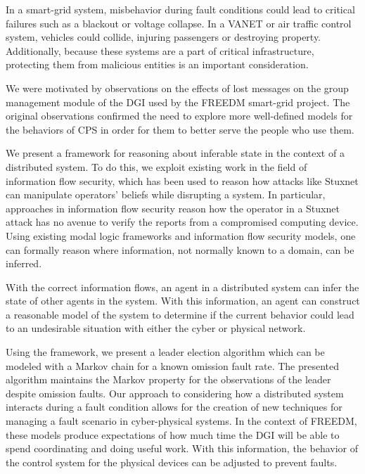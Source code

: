 In a smart-grid system, misbehavior during fault conditions could lead to critical failures such as a blackout or voltage collapse.
In a \ac{VANET} or air traffic control system, vehicles could collide, injuring passengers or destroying property.
Additionally, because these systems are a part of critical infrastructure, protecting them from malicious entities is an important consideration.

We were motivated by observations on the effects of lost messages on the group management module of the \ac{DGI} used by the \ac{FREEDM} smart-grid project.
The original observations confirmed the need to explore more well-defined models for the behaviors of \ac{CPS} in order for them to better serve the people who use them.

We present a framework for reasoning about inferable state in the context of a distributed system.
To do this, we exploit existing work in the field of information flow security, which has been used to reason how attacks like Stuxnet can manipulate operators' beliefs while disrupting a system\cite{STUXNET}.
In particular, approaches in information flow security reason how the operator in a Stuxnet attack has no avenue to verify the reports from a compromised computing device.
Using existing modal logic frameworks and information flow security models\cite{Howser2012}\cite{STUXNET}\cite{Howser2013}, one can formally reason where information, not normally known to a domain, can be inferred.

With the correct information flows, an agent in a distributed system can infer the state of other agents in the system.
With this information, an agent can construct a reasonable model of the system to determine if the current behavior could lead to an undesirable situation with either the cyber or physical network.

Using the framework, we present a leader election algorithm which can be modeled with a Markov chain for a known omission fault\cite{OMISSIONFAILURES} rate.
The presented algorithm maintains the Markov property for the observations of the leader despite omission faults.
Our approach to considering how a distributed system interacts during a fault condition allows for the creation of new techniques for managing a fault scenario in cyber-physical systems.
In the context of \ac{FREEDM}, these models produce expectations of how much time the DGI will be able to spend coordinating and doing useful work.
With this information, the behavior of the control system for the physical devices can be adjusted to prevent faults.

